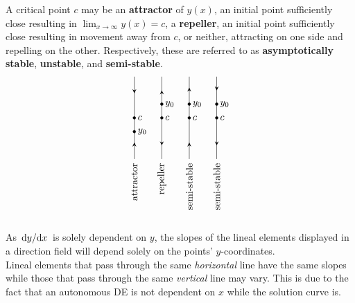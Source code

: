 \documentclass[./Differential Equations.tex]{subfiles}
\begin{document}
				A critical point \(c\) may be an \textbf{attractor} of \(y(x)\), an initial point sufficiently close resulting in \(\displaystyle\lim_{x\to \infty} y(x) = c\), a \textbf{repeller}, an initial point sufficiently close resulting in movement away from \(c\), or neither, attracting on one side and repelling on the other. Respectively, these are referred to as \textbf{asymptotically stable}, \textbf{unstable}, and \textbf{semi-stable}.
				\[\begin{tikzpicture}
					\node[rotate = 90, align = right, text width = 2.1cm] at (0, -1.2) {attractor};
						\draw[] (0, 0) -- (0, 3);
						\filldraw (0, 1.5) circle (0.5mm) node[right]{\(c\)};
						\filldraw (0, 1) circle (0.5mm) node[right]{\(y_0\)};
						\draw[-stealth, thick] (0, 0.5) -- (0, 0.6);
						\draw[-stealth, thick] (0, 2.5) -- (0, 2.4);
					\node[rotate = 90, align = right, text width = 2.1cm] at (1, -1.2){repeller};
						\draw[] (1, 0) -- (1, 3);
						\filldraw (1, 1.5) circle (0.5mm) node[right]{\(c\)};
						\filldraw (1, 2) circle (0.5mm) node[right]{\(y_0\)};
						\draw[-stealth, thick] (1, 0.6) -- (1, 0.5);
						\draw[-stealth, thick] (1, 2.4) -- (1, 2.5);
					\node[rotate = 90, align = right, text width = 2.1cm] at (2, -1.2){semi-stable};
						\draw[] (2, 0) -- (2, 3);
						\filldraw (2, 1.5) circle (0.5mm) node[right]{\(c\)};
						\filldraw (2, 2) circle (0.5mm) node[right]{\(y_0\)};
						\draw[-stealth, thick] (2, 0.5) -- (2, 0.6);
						\draw[-stealth, thick] (2, 2.5) -- (2, 2.6);
					\node[rotate = 90, align = right, text width = 2.1cm] at (3, -1.2){semi-stable};
						\draw[] (3, 0) -- (3, 3);
						\filldraw (3, 1.5) circle (0.5mm) node[right]{\(c\)};
						\filldraw (3, 2) circle (0.5mm) node[right]{\(y_0\)};
						\draw[-stealth, thick] (3, 0.6) -- (3, 0.5);
						\draw[-stealth, thick] (3, 2.6) -- (3, 2.5);	
				\end{tikzpicture}\]
				As \(\dv*{y}{x}\) is solely dependent on \(y\), the slopes of the lineal elements displayed in a direction field will depend solely on the points' \(y\)-coordinates. \\
				Lineal elements that pass through the same \textit{horizontal} line have the same slopes while those that pass through the same \textit{vertical} line may vary.
				This is due to the fact that an autonomous DE is not dependent on \(x\) while the solution curve is.
\end{document}
